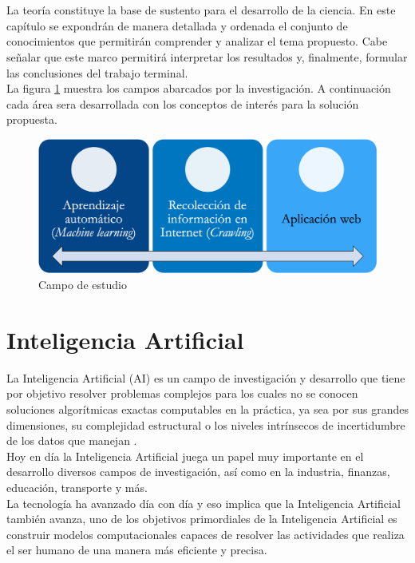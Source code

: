
\ \\\\
La teoría constituye la base de sustento para el desarrollo de la ciencia. En este capítulo se expondrán de manera detallada y ordenada el conjunto de conocimientos que permitirán comprender y analizar el tema propuesto. Cabe señalar que este marco permitirá interpretar los resultados y, finalmente, formular las conclusiones del trabajo terminal.\\

La figura \ref{fig:MarcoT} muestra los campos abarcados por la investigación.
A continuación cada área sera desarrollada con los conceptos de interés para la solución propuesta.

\begin{figure}[H]
	\centering
	\includegraphics[scale=.3]{imagenes/Capitulo3/Marco.png}
	\caption{Campo de estudio}
	\label{fig:MarcoT}
\end{figure}

\section{Inteligencia Artificial}
La Inteligencia Artificial (AI) es un campo de investigación y desarrollo que tiene por objetivo 
resolver problemas complejos para los cuales no se conocen soluciones algorítmicas exactas 
computables en la práctica, ya sea por sus grandes dimensiones, su complejidad estructural o los 
niveles intrínsecos de incertidumbre de los datos que manejan \citep{CT1}.
\\
Hoy en día la Inteligencia Artificial juega un papel muy importante en el desarrollo diversos 
campos de investigación, así como en la industria, finanzas, educación, transporte y más.
\\
La tecnología ha avanzado día con día y eso implica que la Inteligencia Artificial también avanza, 
uno de los objetivos primordiales de la Inteligencia Artificial es construir modelos computacionales 
capaces de resolver las actividades que realiza el ser humano de una manera más eficiente y precisa.


